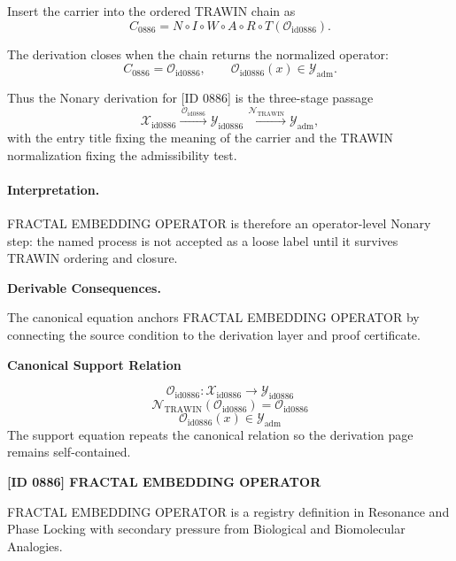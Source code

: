 Insert the carrier into the ordered TRAWIN chain as\[
C_{0886}=N\circ I\circ W\circ A\circ R\circ T(\mathcal{O}_{\mathrm{id0886}}).
\]

The derivation closes when the chain returns the normalized operator:\[
C_{0886}=\mathcal{O}_{\mathrm{id0886}},\qquad \mathcal{O}_{\mathrm{id0886}}(x)\in\mathcal{Y}_{\mathrm{adm}}.
\]

Thus the Nonary derivation for [ID 0886] is the three-stage passage
\[
\mathcal{X}_{\mathrm{id0886}}\xrightarrow{\,\mathcal{O}_{\mathrm{id0886}}\,} \mathcal{Y}_{\mathrm{id0886}}\xrightarrow{\,\mathcal{N}_{\mathrm{TRAWIN}}\,} \mathcal{Y}_{\mathrm{adm}},
\]
with the entry title fixing the meaning of the carrier and the TRAWIN normalization fixing the admissibility test.

\paragraph{Interpretation.} FRACTAL EMBEDDING OPERATOR is therefore an operator-level Nonary step: the named process is not accepted as a loose label until it survives TRAWIN ordering and closure.

\par\vspace{0.35em}
\noindent\textbf{Derivable Consequences.}\quad
\begingroup
\footnotesize
\raggedright
The canonical equation anchors FRACTAL EMBEDDING OPERATOR by connecting the source condition to the derivation layer and proof certificate.
\par\endgroup

\noindent\textbf{Canonical Support Relation}\par
\[
\mathcal{O}_{\mathrm{id0886}}:\mathcal{X}_{\mathrm{id0886}}\longrightarrow\mathcal{Y}_{\mathrm{id0886}}
\]
\[
\mathcal{N}_{\mathrm{TRAWIN}}(\mathcal{O}_{\mathrm{id0886}})=\mathcal{O}_{\mathrm{id0886}}
\]
\[
\mathcal{O}_{\mathrm{id0886}}(x)\in\mathcal{Y}_{\mathrm{adm}}
\]
\noindent The support equation repeats the canonical relation so the derivation page remains self-contained.\par

\clearpage
\noindent\textbf{[ID 0886] FRACTAL EMBEDDING OPERATOR}\par
\vspace{0.35em}
\begingroup\small
{}
FRACTAL EMBEDDING OPERATOR is a registry definition in Resonance and Phase Locking with secondary pressure from Biological and Biomolecular Analogies.


